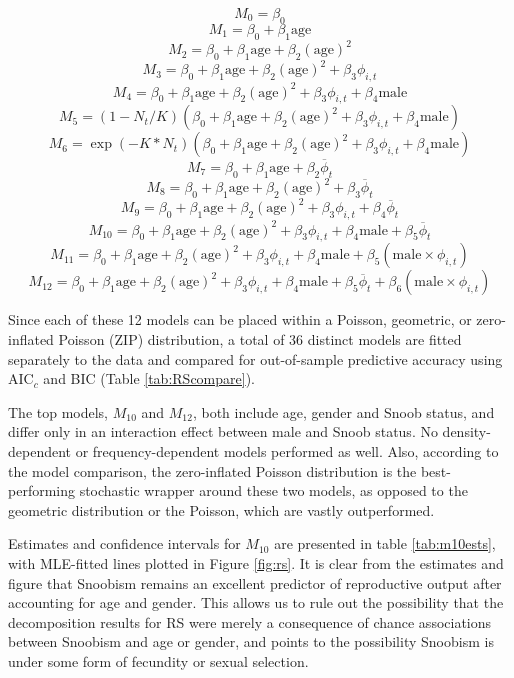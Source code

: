 \documentclass[11pt]{article}
\begin{document}
	\[M_0 = \beta_0
\]
	\[M_1 = \beta_0 + \beta_1 \mathrm{age}
\]
	\[M_2 = \beta_0 + \beta_1 \mathrm{age} + \beta_2 \mathrm{(age)}^2
\]
	\[M_3 = \beta_0 + \beta_1 \mathrm{age} + \beta_2 \mathrm{(age)}^2 + \beta_3 \phi_{i,t}
\]
	\[M_4 = \beta_0 + \beta_1 \mathrm{age} + \beta_2 \mathrm{(age)}^2 + \beta_3 \phi_{i,t} + \beta_4 \mathrm{male}
\]
	\[M_5 = (1-N_t/K)(\beta_0 + \beta_1 \mathrm{age} + \beta_2 \mathrm{(age)}^2 + \beta_3 \phi_{i,t} + \beta_4 \mathrm{male})
\]
	\[M_6 = \exp(-K*N_t)(\beta_0 + \beta_1 \mathrm{age} + \beta_2 \mathrm{(age)}^2 + \beta_3 \phi_{i,t} + \beta_4 \mathrm{male})
\]
	\[M_7 = \beta_0 + \beta_1 \mathrm{age} + \beta_2 \overline{\phi}_t
\]
	\[M_8 = \beta_0 + \beta_1 \mathrm{age} + \beta_2 \mathrm{(age)}^2 + \beta_3 \overline{\phi}_t
\]
	\[M_9 = \beta_0 + \beta_1 \mathrm{age} + \beta_2 \mathrm{(age)}^2 + \beta_3 \phi_{i,t} + \beta_4 \overline{\phi}_t
\]
	\[M_{10} = \beta_0 + \beta_1 \mathrm{age} + \beta_2 \mathrm{(age)}^2 + \beta_3 \phi_{i,t} + \beta_4 \mathrm{male} + \beta_5 \overline{\phi}_t
\]
	\[M_{11} = \beta_0 + \beta_1 \mathrm{age} + \beta_2 \mathrm{(age)}^2 + \beta_3 \phi_{i,t} + \beta_4 \mathrm{male} + \beta_5 (\mathrm{male} \times \phi_{i,t})
\]
	\[M_{12} = \beta_0 + \beta_1 \mathrm{age} + \beta_2 \mathrm{(age)}^2 + \beta_3 \phi_{i,t} + \beta_4 \mathrm{male} + \beta_5 \overline{\phi}_t + \beta_6 (\mathrm{male} \times \phi_{i,t})
\]

Since each of these 12 models can be placed within a Poisson, geometric, or zero-inflated Poisson (ZIP) distribution, a total of 36 distinct models are fitted separately to the data and compared for out-of-sample predictive accuracy using AIC$_c$ and BIC (Table \ref{tab:RScompare}).

The top models, $M_{10}$ and $M_{12}$, both include age, gender and Snoob status, and differ only in an interaction effect between male and Snoob status.  No density-dependent or frequency-dependent models performed as well.  Also, according to the model comparison, the zero-inflated Poisson distribution is the best-performing stochastic wrapper around these two models, as opposed to the geometric distribution or the Poisson, which are vastly outperformed.

Estimates and confidence intervals for $M_{10}$ are presented in table \ref{tab:m10ests}, with MLE-fitted lines plotted in Figure \ref{fig:rs}.  It is clear from the estimates and figure that Snoobism remains an excellent predictor of reproductive output after accounting for age and gender.  This allows us to rule out the possibility that the decomposition results for RS were merely a consequence of chance associations between Snoobism and age or gender, and points to the possibility Snoobism is under some form of fecundity or sexual selection.    
\end{document}
